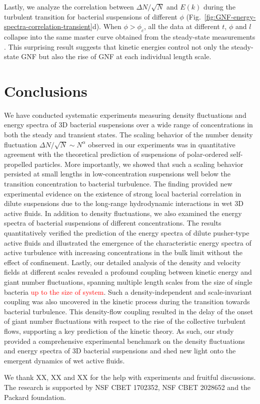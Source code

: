 \documentclass[twocolumn,aps,prx,amsmath,amssymb,longbibliography]{revtex4-2}
\begin{document}
Lastly, we analyze the correlation between $\Delta N/\sqrt N$ and $E(k)$ during the turbulent transition for bacterial suspensions of different $\phi$ (Fig.~\ref{fig:GNF-energy-spectra-correlation-transient}d). When $\phi>\phi_c$, all the data at different $t$, $\phi$ and $l$ collapse into the same master curve obtained from the steady-state measurements \cite{Liu2020}.
This surprising result suggests that kinetic energies control not only the steady-state GNF but also the rise of GNF at each individual length scale.

\section{Conclusions}

We have conducted systematic experiments measuring density fluctuations and energy spectra of 3D bacterial suspensions over a wide range of concentrations in both the steady and transient states. The scaling behavior of the number density fluctuation $\Delta N/\sqrt N \sim N^\alpha$ observed in our experiments was in quantitative agreement with the theoretical prediction of suspensions of polar-ordered self-propelled particles. More importantly, we showed that such a scaling behavior persisted at small lengths in low-concentration suspensions well below the transition concentration to bacterial turbulence. The finding provided new experimental evidence on the existence of strong local bacterial correlation in dilute suspensions due to the long-range hydrodynamic interactions in wet 3D active fluids. In addition to density fluctuations, we also examined the energy spectra of bacterial suspensions of different concentrations. The results quantitatively verified the prediction of the energy spectra of dilute pusher-type active fluids and illustrated the emergence of the characteristic energy spectra of active turbulence with increasing concentrations in the bulk limit without the effect of confinement. Lastly, our detailed analysis of the density and velocity fields at different scales revealed a profound coupling between kinetic energy and giant number fluctuations, spanning multiple length scales from the size of single bacteria \textcolor{red}{up to the size of system}. Such a density-independent and scale-invariant coupling was also uncovered in the kinetic process during the transition towards bacterial turbulence. This density-flow coupling resulted in the delay of the onset of giant number fluctuations with respect to the rise of the collective turbulent flows, supporting a key prediction of the kinetic theory. As such, our study provided a comprehensive experimental benchmark on the density fluctuations and energy spectra of 3D bacterial suspensions and shed new light onto the emergent dynamics of wet active fluids. \\

\begin{acknowledgements}
	We thank XX, XX and XX for the help with experiments and fruitful discussions. The research is supported by NSF CBET 1702352, NSF CBET 2028652 and the Packard foundation.
\end{acknowledgements}



\end{document}
